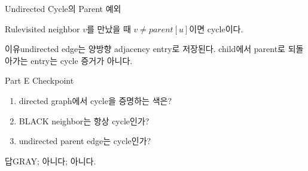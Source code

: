 \begin{frame}{Undirected Cycle의 Parent 예외}
\begin{block}{Rule}visited neighbor \(v\)를 만났을 때 \(v\ne parent[u]\)이면 cycle이다.\end{block}
\begin{alertblock}{이유}undirected edge는 양방향 adjacency entry로 저장된다. child에서 parent로 되돌아가는 entry는 cycle 증거가 아니다.\end{alertblock}
\end{frame}
\begin{frame}{Part E Checkpoint}
\begin{enumerate}\item directed graph에서 cycle을 증명하는 색은?\item BLACK neighbor는 항상 cycle인가?\item undirected parent edge는 cycle인가?\end{enumerate}
\begin{exampleblock}{답}GRAY; 아니다; 아니다.\end{exampleblock}
\end{frame}

